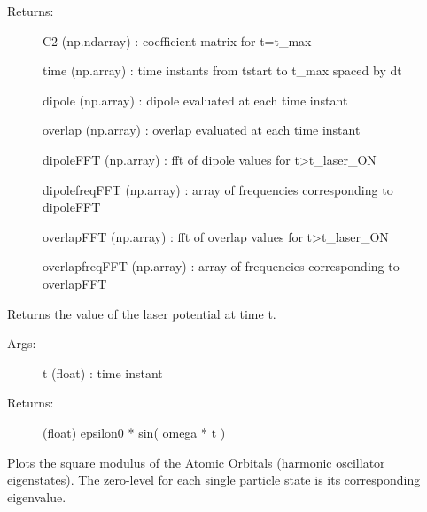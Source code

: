 \documentclass[letterpaper,10pt,english]{sphinxmanual}
\begin{document}
\begin{fulllineitems}
\begin{fulllineitems}
\begin{description}
\item[{Returns:}] \leavevmode
C2 (np.ndarray) : coefficient matrix for t=t\_max

time (np.array) : time instants from tstart to t\_max spaced by dt

dipole (np.array) : dipole evaluated at each time instant

overlap (np.array) : overlap evaluated at each time instant

dipoleFFT (np.array) : fft of dipole values for t\textgreater{}t\_laser\_ON

dipolefreqFFT (np.array) : array of frequencies corresponding to dipoleFFT

overlapFFT (np.array) : fft of overlap values for t\textgreater{}t\_laser\_ON

overlapfreqFFT (np.array) : array of frequencies corresponding to overlapFFT

\end{description}

\end{fulllineitems}


\begin{fulllineitems}
\label{\detokenize{index:do.GHF.laser_potential}}
Returns the value of the laser potential at time t.
\begin{description}
\item[{Args:}] \leavevmode
t (float) : time instant

\item[{Returns:}] \leavevmode
(float) epsilon0 * sin( omega * t )

\end{description}

\end{fulllineitems}


\begin{fulllineitems}
\label{\detokenize{index:do.GHF.plot_AO}}
Plots the square modulus of the Atomic Orbitals (harmonic oscillator eigenstates).
The zero-level for each single particle state is its corresponding eigenvalue.

\end{fulllineitems}


\end{fulllineitems}
\end{document}
